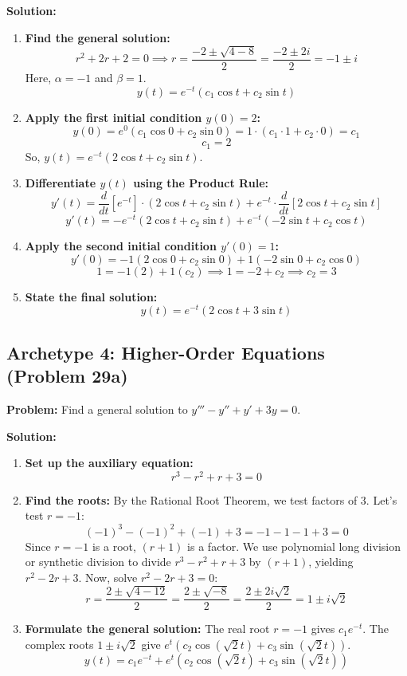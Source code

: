 \documentclass[11pt]{article}
\begin{document}
\textbf{Solution:}
\begin{enumerate}
    \item \textbf{Find the general solution:}
    \[ r^2 + 2r + 2 = 0 \implies r = \frac{-2 \pm \sqrt{4 - 8}}{2} = \frac{-2 \pm 2i}{2} = -1 \pm i \]
    Here, $\alpha = -1$ and $\beta = 1$.
    \[ y(t) = e^{-t}(c_1 \cos t + c_2 \sin t) \]
    \item \textbf{Apply the first initial condition $y(0) = 2$:}
    \[ y(0) = e^{0}(c_1 \cos 0 + c_2 \sin 0) = 1 \cdot (c_1 \cdot 1 + c_2 \cdot 0) = c_1 \]
    \[ c_1 = 2 \]
    So, $y(t) = e^{-t}(2 \cos t + c_2 \sin t)$.
    \item \textbf{Differentiate $y(t)$ using the Product Rule:}
    \[ y'(t) = \frac{d}{dt}[e^{-t}] \cdot (2 \cos t + c_2 \sin t) + e^{-t} \cdot \frac{d}{dt}[2 \cos t + c_2 \sin t] \]
    \[ y'(t) = -e^{-t}(2 \cos t + c_2 \sin t) + e^{-t}(-2 \sin t + c_2 \cos t) \]
    \item \textbf{Apply the second initial condition $y'(0) = 1$:}
    \[ y'(0) = -1(2 \cos 0 + c_2 \sin 0) + 1(-2 \sin 0 + c_2 \cos 0) \]
    \[ 1 = -1(2) + 1(c_2) \implies 1 = -2 + c_2 \implies c_2 = 3 \]
    \item \textbf{State the final solution:}
    \[ y(t) = e^{-t}(2 \cos t + 3 \sin t) \]
\end{enumerate}

\subsection{Archetype 4: Higher-Order Equations (Problem 29a)}
\textbf{Problem:} Find a general solution to $y''' - y'' + y' + 3y = 0$.

\textbf{Solution:}
\begin{enumerate}
    \item \textbf{Set up the auxiliary equation:}
    \[ r^3 - r^2 + r + 3 = 0 \]
    \item \textbf{Find the roots:}
    By the Rational Root Theorem, we test factors of 3. Let's test $r = -1$:
    \[ (-1)^3 - (-1)^2 + (-1) + 3 = -1 - 1 - 1 + 3 = 0 \]
    Since $r = -1$ is a root, $(r+1)$ is a factor. We use polynomial long division or synthetic division to divide $r^3 - r^2 + r + 3$ by $(r+1)$, yielding $r^2 - 2r + 3$.
    Now, solve $r^2 - 2r + 3 = 0$:
    \[ r = \frac{2 \pm \sqrt{4 - 12}}{2} = \frac{2 \pm \sqrt{-8}}{2} = \frac{2 \pm 2i\sqrt{2}}{2} = 1 \pm i\sqrt{2} \]
    \item \textbf{Formulate the general solution:}
    The real root $r = -1$ gives $c_1 e^{-t}$. The complex roots $1 \pm i\sqrt{2}$ give $e^t(c_2 \cos(\sqrt{2}t) + c_3 \sin(\sqrt{2}t))$.
    \[ y(t) = c_1 e^{-t} + e^t(c_2 \cos(\sqrt{2}t) + c_3 \sin(\sqrt{2}t)) \]
\end{enumerate}
\end{document}
